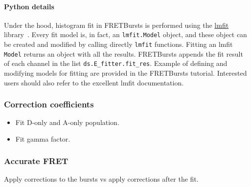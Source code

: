 \paragraph{Python details}
Under the hood, histogram fit in FRETBursts is performed using the
\href{http://lmfit.github.io/lmfit-py/}{lmfit} library~\cite{c09228b4-321a-404b-8f8c-e56696295eda}.
Every fit model is, in fact, an \verb|lmfit.Model| object, and these object
can be created and modified by calling directly \verb|lmfit| functions.
Fitting an lmfit \verb|Model| returns an object with all the results.
FRETBursts appends the fit result of each channel in the list 
\verb|ds.E_fitter.fit_res|.
Example of defining and modifying models for fitting are provided in the FRETBursts tutorial. 
Interested users should also refer to the excellent lmfit documentation.

\subsubsection{Correction coefficients}

\begin{itemize}
\item Fit D-only and A-only population.
\item Fit gamma factor.
\end{itemize}


\subsubsection{Accurate FRET}

Apply corrections to the bursts vs apply corrections after the fit.


